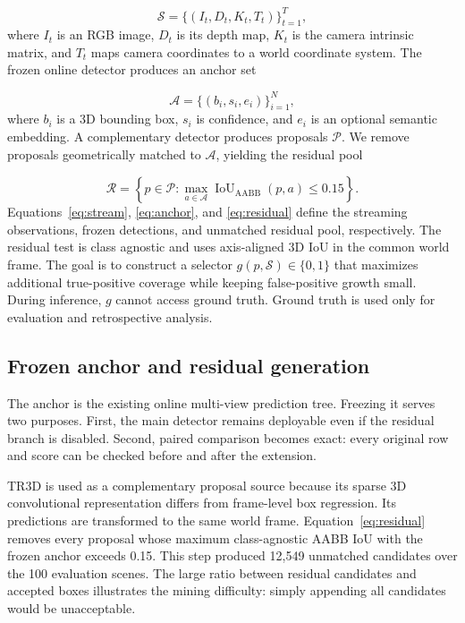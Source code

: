 \documentclass[11pt,a4paper]{article}
\begin{document}
\begin{equation}
\mathcal{S}=\{(I_t,D_t,K_t,T_t)\}_{t=1}^{T},
\label{eq:stream}
\end{equation}
where \(I_t\) is an RGB image, \(D_t\) is its depth map, \(K_t\) is the camera intrinsic matrix, and \(T_t\) maps camera coordinates to a world coordinate system. The frozen online detector produces an anchor set

\begin{equation}
\mathcal{A}=\{(b_i,s_i,e_i)\}_{i=1}^{N},
\label{eq:anchor}
\end{equation}
where \(b_i\) is a 3D bounding box, \(s_i\) is confidence, and \(e_i\) is an optional semantic embedding. A complementary detector produces proposals \(\mathcal{P}\). We remove proposals geometrically matched to \(\mathcal{A}\), yielding the residual pool

\begin{equation}
\mathcal{R}=\left\{p\in\mathcal{P}: \max_{a\in\mathcal{A}}
\operatorname{IoU}_{\mathrm{AABB}}(p,a)\le 0.15\right\}.
\label{eq:residual}
\end{equation}
Equations~\eqref{eq:stream}, \eqref{eq:anchor}, and \eqref{eq:residual} define the streaming observations, frozen detections, and unmatched residual pool, respectively. The residual test is class agnostic and uses axis-aligned 3D IoU in the common world frame. The goal is to construct a selector \(g(p,\mathcal{S})\in\{0,1\}\) that maximizes additional true-positive coverage while keeping false-positive growth small. During inference, \(g\) cannot access ground truth. Ground truth is used only for evaluation and retrospective analysis.

\subsection{Frozen anchor and residual generation}
The anchor is the existing online multi-view prediction tree. Freezing it serves two purposes. First, the main detector remains deployable even if the residual branch is disabled. Second, paired comparison becomes exact: every original row and score can be checked before and after the extension.

TR3D is used as a complementary proposal source because its sparse 3D convolutional representation differs from frame-level box regression. Its predictions are transformed to the same world frame. Equation~\eqref{eq:residual} removes every proposal whose maximum class-agnostic AABB IoU with the frozen anchor exceeds 0.15. This step produced 12,549 unmatched candidates over the 100 evaluation scenes. The large ratio between residual candidates and accepted boxes illustrates the mining difficulty: simply appending all candidates would be unacceptable.
\end{document}
